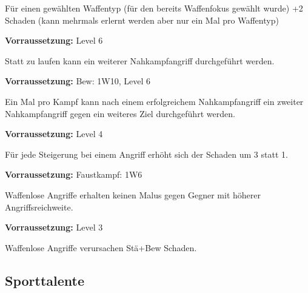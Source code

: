\documentclass[../../Heldenanleitung2]{subfiles}
\begin{document}
\begin{multicols}{2}
\begin{tcolorbox}[title={Waffenspezialisierung},colbacktitle=red, coltitle=black]
   Für einen gewählten Waffentyp (für den bereits Waffenfokus gewählt wurde) +2 Schaden (kann mehrmals erlernt werden aber nur ein Mal pro Waffentyp)
\end{tcolorbox}

\begin{tcolorbox}[title={Doppelangriff},colbacktitle=red, coltitle=black]  
	\textbf{Vorraussetzung:} Level 6
	\vspace{0.2cm}
	  
   Statt zu laufen kann ein weiterer Nahkampfangriff durchgeführt werden.
\end{tcolorbox}

\begin{tcolorbox}[title={Flüssige Bewegung},colbacktitle=red, coltitle=black]  
	\textbf{Vorraussetzung:} Bew: 1W10, Level 6
	\vspace{0.2cm}
	  
   Ein Mal pro Kampf kann nach einem erfolgreichem Nahkampfangriff ein zweiter Nahkampfangriff gegen ein weiteres Ziel durchgeführt werden.
\end{tcolorbox}

\begin{tcolorbox}[title={Gezielte Treffer},colbacktitle=red, coltitle=black]  
	\textbf{Vorraussetzung:} Level 4
	\vspace{0.2cm}
	  
    Für jede Steigerung bei einem Angriff erhöht sich der Schaden um 3 statt 1.
\end{tcolorbox}

\begin{tcolorbox}[title={Waffenloser Kampf},colbacktitle=red, coltitle=black]	  
	\textbf{Vorraussetzung:} Faustkampf: 1W6
	\vspace{0.2cm}
	
    Waffenlose Angriffe erhalten keinen Malus gegen Gegner mit höherer Angriffsreichweite.
\end{tcolorbox}

\begin{tcolorbox}[title={Schnelle Schläge},colbacktitle=red, coltitle=black]	  
	\textbf{Vorraussetzung:} Level 3
	\vspace{0.2cm}
	  
    Waffenlose Angriffe verursachen Stä+Bew Schaden.
\end{tcolorbox}
\end{multicols}

\subsection{Sporttalente}
\end{document}
